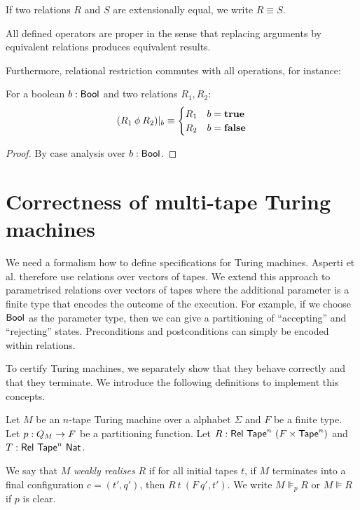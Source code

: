 \documentclass{psartcl}
\begin{document}

If two relations $R$ and $S$ are extensionally equal, we write $R \equiv S$.

All defined operators are proper in the sense that replacing arguments by equivalent relations produces equivalent results.

Furthermore, relational restriction commutes with all operations, for instance:

\begin{lemma}
  For a boolean $b:\textsf{Bool}$ and two relations $R_1, R_2$:
  $$(R_1 \mathbin{\phi} R_2)|_{b} \equiv
  \begin{cases}
    R_1 & b = \mathbf{true} \\
    R_2 & b = \mathbf{false}
  \end{cases} $$
\end{lemma}
\begin{proof}
  By case analysis over $b:\textsf{Bool}$.
\end{proof}



\section{Correctness of multi-tape Turing machines}
\label{sec:verification}

We need a formalism how to define specifications for Turing machines.  Asperti et al. therefore use relations over vectors of tapes.  We extend this
approach to parametrised relations over vectors of tapes where the additional parameter is a finite type that encodes the outcome of the execution.
For example, if we choose $\textsf{Bool}$ as the parameter type, then we can give a partitioning of ``accepting'' and ``rejecting'' states.  Preconditions and
postconditions can simply be encoded within relations.

To certify Turing machines, we separately show that they behave correctly and that they terminate.
We introduce the following definitions to implement this concepts.

Let $M$ be an $n$-tape Turing machine over a alphabet $\Sigma$ and $F$ be a finite type.
Let $p : Q_M \rightarrow F$ be a partitioning function.
Let $R:\mathsf{Rel}~\textsf{Tape}^{n}~(F \times \textsf{Tape}^{n})$ and $T:\mathsf{Rel}~\textsf{Tape}^{n}~\textsf{Nat}$.

\begin{definition}
  \label{def:wrealise}
  We say that $M$ \emph{weakly realises} $R$ if for all initial tapes $t$, if $M$ terminates into a final configuration $c=(t', q')$, then
  $R~t~(F~q', t')$.
  We write $M \VDash_p R$ or $M \VDash R$ if $p$ is clear.
\end{definition}
\end{document}
